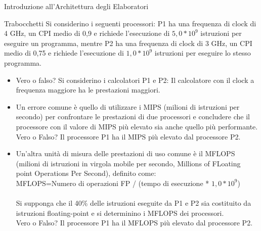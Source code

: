 \documentclass[11pt]{article}
\begin{document}
\begin{quiz}{Introduzione all'Architettura degli Elaboratori}
\begin{cloze}[points=1,shuffle=true]{Trabocchetti}
Si considerino i seguenti processori: P1 ha una frequenza di clock di 4 GHz, un CPI medio di 0,9 e richiede l'esecuzione di $5,0*10^9$ istruzioni per eseguire un programma, mentre P2 ha una frequenza di clock di 3 GHz, un CPI medio di 0,75 e richiede l'esecuzione di $1,0*10^9$ istruzioni per eseguire lo stesso programma.
\begin{itemize}
    \item Vero o falso? Si considerino i calcolatori P1 e P2: Il calcolatore con il clock a frequenza maggiore ha le prestazioni maggiori.
    \item Un errore comune è quello di utilizzare i MIPS (milioni di istruzioni per secondo) per confrontare le prestazioni di due processori e concludere che il processore con il valore di MIPS più elevato sia anche quello più performante.\\
    Vero o Falso? Il processore P1 ha il MIPS più elevato dal processore P2.
    \item Un'altra unità di misura delle prestazioni di uso comune è il MFLOPS (milioni di istruzioni in virgola mobile per secondo, Millions of FLoating point Operations Per Second), definito come:\\
    MFLOPS=Numero di operazioni FP / (tempo di esecuzione * $1,0*10^9$)\\
    \\
    Si supponga che il 40\% delle istruzioni eseguite da P1 e P2 sia costituito da istruzioni floating-point e si determinino i MFLOPS dei processori.\\
    Vero o Falso? Il processore P1 ha il MFLOPS più elevato dal processore P2.
\end{itemize}
\end{cloze}


\end{quiz}
\end{document}
